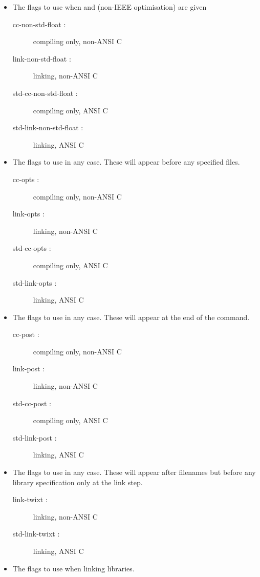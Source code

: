 \begin{itemize}
\item The flags to use when  and 
(non-IEEE optimisation) are given
\begin{description}
\item    [cc-non-std-float :] compiling only, non-ANSI C
\item    [link-non-std-float :] linking, non-ANSI C
\item    [std-cc-non-std-float :] compiling only, ANSI C
\item    [std-link-non-std-float :] linking, ANSI C
\end{description}

\item The flags to use in any case. These will appear before any specified files.
\begin{description}
\item    [cc-opts :] compiling only, non-ANSI C 
\item    [link-opts :] linking, non-ANSI C
\item    [std-cc-opts :] compiling only, ANSI C
\item    [std-link-opts :] linking, ANSI C
\end{description}

\item The flags to use in any case. These will appear at the end of the command.
\begin{description}
\item    [cc-post :] compiling only, non-ANSI C 
\item    [link-post :] linking, non-ANSI C
\item    [std-cc-post :] compiling only, ANSI C
\item    [std-link-post :] linking, ANSI C
\end{description}

\item The flags to use in any case. These will appear after filenames but before 
any library specification only at the link step.
\begin{description}
\item    [link-twixt :]  linking, non-ANSI C
\item    [std-link-twixt :] linking, ANSI C
\end{description}

\item The flags to use when linking libraries.
\begin{description}


\end{description}
\end{itemize}
